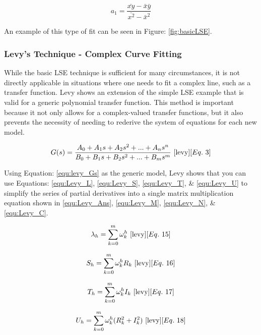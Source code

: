 \begin{equation}
    \label{equ:LSE_sold}
    a_1 = \frac{\bar{xy} - \bar{x}\bar{y}}{\bar{x^2} - \bar{x}^2}
\end{equation}

An example of this type of fit can be seen in Figure: \ref{fig:basicLSE}.


\subsubsection{Levy's Technique - Complex Curve Fitting}
While the basic LSE technique is sufficient for many circumstances, it is not directly applicable in situations where one needs to fit a complex line, such as a transfer function. Levy \cite{levy} shows an extension of the simple LSE example that is valid for a generic polynomial transfer function. This method is important because it not only allows for a complex-valued transfer functions, but it also prevents the necessity of needing to rederive the system of equations for each new model. 

\begin{equation}
    \label{equ:levy_Gs}
    G(s) = \frac{A_0 + A_1 s + A_2 s^2 + ... + A_n s^n}{B_0 + B_1 s + B_2 s^2 + ... + B_m s^m}
    ~\cite{levy}[Eq.~3]
\end{equation}

Using Equation: \eqref{equ:levy_Gs} as the generic model, Levy shows that you can use Equations: \eqref{equ:Levy_L}, \eqref{equ:Levy_S}, \eqref{equ:Levy_T}, \& \eqref{equ:Levy_U} to simplify the series of partial derivatives into a single matrix multiplication equation shown in \eqref{equ:Levy_Ans}, \eqref{equ:Levy_M}, \eqref{equ:Levy_N}, \& \eqref{equ:Levy_C}.

\begin{equation}
    \label{equ:Levy_L}
    \lambda _h = \sum_{k=0}^{m} \omega _k ^h
    ~\cite{levy}[Eq.~15]
\end{equation}

\begin{equation}
    \label{equ:Levy_S}
    S_h = \sum_{k=0}^{m} \omega _k ^h R_k
    ~\cite{levy}[Eq.~16]
\end{equation}

\begin{equation}
    \label{equ:Levy_T}
    T_h = \sum_{k=0}^{m} \omega _k ^h I_k
    ~\cite{levy}[Eq.~17]
\end{equation}

\begin{equation}
    \label{equ:Levy_U}
    U_h = \sum_{k=0}^{m} \omega _k ^h (R_k ^2 + I_k ^2)
    ~\cite{levy}[Eq.~18]
\end{equation}

